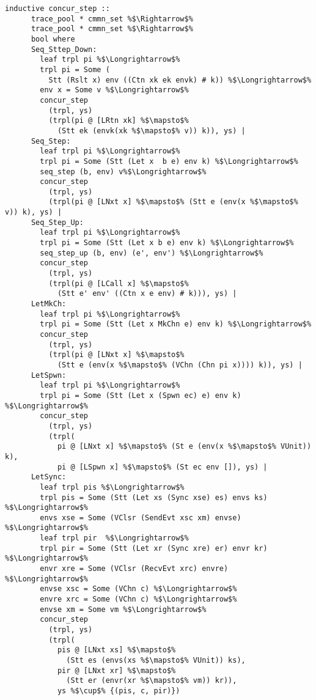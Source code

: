 \documentclass{article}
\begin{document}
\begin{lstlisting}[style=codestyle1, escapechar=\%]
    inductive concur_step ::
      trace_pool * cmmn_set %$\Rightarrow$%
      trace_pool * cmmn_set %$\Rightarrow$%
      bool where 
      Seq_Sttep_Down:
        leaf trpl pi %$\Longrightarrow$%
        trpl pi = Some (
          Stt (Rslt x) env ((Ctn xk ek envk) # k)) %$\Longrightarrow$%
        env x = Some v %$\Longrightarrow$%
        concur_step
          (trpl, ys)
          (trpl(pi @ [LRtn xk] %$\mapsto$%
            (Stt ek (envk(xk %$\mapsto$% v)) k)), ys) |
      Seq_Step:
        leaf trpl pi %$\Longrightarrow$%
        trpl pi = Some (Stt (Let x  b e) env k) %$\Longrightarrow$%
        seq_step (b, env) v%$\Longrightarrow$%
        concur_step
          (trpl, ys)
          (trpl(pi @ [LNxt x] %$\mapsto$% (Stt e (env(x %$\mapsto$% v)) k), ys) |
      Seq_Step_Up: 
        leaf trpl pi %$\Longrightarrow$%
        trpl pi = Some (Stt (Let x b e) env k) %$\Longrightarrow$%
        seq_step_up (b, env) (e', env') %$\Longrightarrow$%
        concur_step
          (trpl, ys)
          (trpl(pi @ [LCall x] %$\mapsto$%
            (Stt e' env' ((Ctn x e env) # k))), ys) |
      LetMkCh: 
        leaf trpl pi %$\Longrightarrow$%
        trpl pi = Some (Stt (Let x MkChn e) env k) %$\Longrightarrow$%
        concur_step
          (trpl, ys)
          (trpl(pi @ [LNxt x] %$\mapsto$%
            (Stt e (env(x %$\mapsto$% (VChn (Chn pi x)))) k)), ys) |
      LetSpwn:
        leaf trpl pi %$\Longrightarrow$%
        trpl pi = Some (Stt (Let x (Spwn ec) e) env k) %$\Longrightarrow$%
        concur_step
          (trpl, ys)
          (trpl(
            pi @ [LNxt x] %$\mapsto$% (St e (env(x %$\mapsto$% VUnit)) k), 
            pi @ [LSpwn x] %$\mapsto$% (St ec env []), ys) |
      LetSync:
        leaf trpl pis %$\Longrightarrow$%
        trpl pis = Some (Stt (Let xs (Sync xse) es) envs ks) %$\Longrightarrow$%
        envs xse = Some (VClsr (SendEvt xsc xm) envse) %$\Longrightarrow$%
        leaf trpl pir  %$\Longrightarrow$%
        trpl pir = Some (Stt (Let xr (Sync xre) er) envr kr) %$\Longrightarrow$%
        envr xre = Some (VClsr (RecvEvt xrc) envre) %$\Longrightarrow$%
        envse xsc = Some (VChn c) %$\Longrightarrow$%
        envre xrc = Some (VChn c) %$\Longrightarrow$%
        envse xm = Some vm %$\Longrightarrow$%
        concur_step
          (trpl, ys)
          (trpl(
            pis @ [LNxt xs] %$\mapsto$%
              (Stt es (envs(xs %$\mapsto$% VUnit)) ks), 
            pir @ [LNxt xr] %$\mapsto$%
              (Stt er (envr(xr %$\mapsto$% vm)) kr)), 
            ys %$\cup$% {(pis, c, pir)})

    \end{lstlisting}
\end{document}

